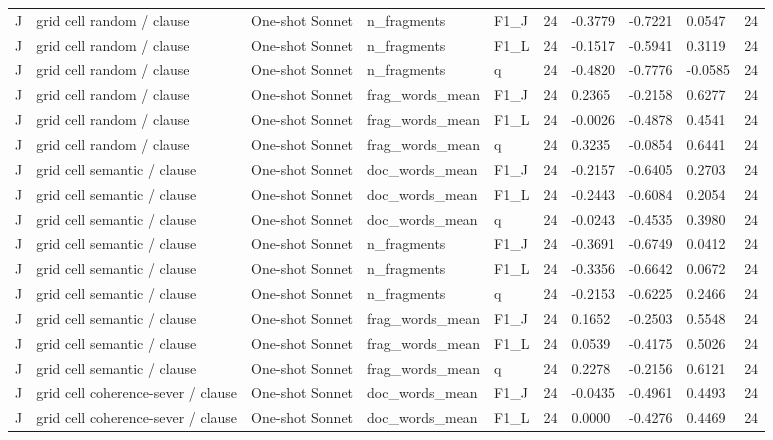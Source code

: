 \begin{table}[t]
{\begin{tabular}{llllllllll}
J & grid cell random / clause & One-shot Sonnet & n\_fragments & F1\_J & 24 & -0.3779 & -0.7221 & 0.0547 & 24 \\
J & grid cell random / clause & One-shot Sonnet & n\_fragments & F1\_L & 24 & -0.1517 & -0.5941 & 0.3119 & 24 \\
J & grid cell random / clause & One-shot Sonnet & n\_fragments & q & 24 & -0.4820 & -0.7776 & -0.0585 & 24 \\
J & grid cell random / clause & One-shot Sonnet & frag\_words\_mean & F1\_J & 24 & 0.2365 & -0.2158 & 0.6277 & 24 \\
J & grid cell random / clause & One-shot Sonnet & frag\_words\_mean & F1\_L & 24 & -0.0026 & -0.4878 & 0.4541 & 24 \\
J & grid cell random / clause & One-shot Sonnet & frag\_words\_mean & q & 24 & 0.3235 & -0.0854 & 0.6441 & 24 \\
J & grid cell semantic / clause & One-shot Sonnet & doc\_words\_mean & F1\_J & 24 & -0.2157 & -0.6405 & 0.2703 & 24 \\
J & grid cell semantic / clause & One-shot Sonnet & doc\_words\_mean & F1\_L & 24 & -0.2443 & -0.6084 & 0.2054 & 24 \\
J & grid cell semantic / clause & One-shot Sonnet & doc\_words\_mean & q & 24 & -0.0243 & -0.4535 & 0.3980 & 24 \\
J & grid cell semantic / clause & One-shot Sonnet & n\_fragments & F1\_J & 24 & -0.3691 & -0.6749 & 0.0412 & 24 \\
J & grid cell semantic / clause & One-shot Sonnet & n\_fragments & F1\_L & 24 & -0.3356 & -0.6642 & 0.0672 & 24 \\
J & grid cell semantic / clause & One-shot Sonnet & n\_fragments & q & 24 & -0.2153 & -0.6225 & 0.2466 & 24 \\
J & grid cell semantic / clause & One-shot Sonnet & frag\_words\_mean & F1\_J & 24 & 0.1652 & -0.2503 & 0.5548 & 24 \\
J & grid cell semantic / clause & One-shot Sonnet & frag\_words\_mean & F1\_L & 24 & 0.0539 & -0.4175 & 0.5026 & 24 \\
J & grid cell semantic / clause & One-shot Sonnet & frag\_words\_mean & q & 24 & 0.2278 & -0.2156 & 0.6121 & 24 \\
J & grid cell coherence-sever / clause & One-shot Sonnet & doc\_words\_mean & F1\_J & 24 & -0.0435 & -0.4961 & 0.4493 & 24 \\
J & grid cell coherence-sever / clause & One-shot Sonnet & doc\_words\_mean & F1\_L & 24 & 0.0000 & -0.4276 & 0.4469 & 24 \\

\end{tabular}}
\end{table}

